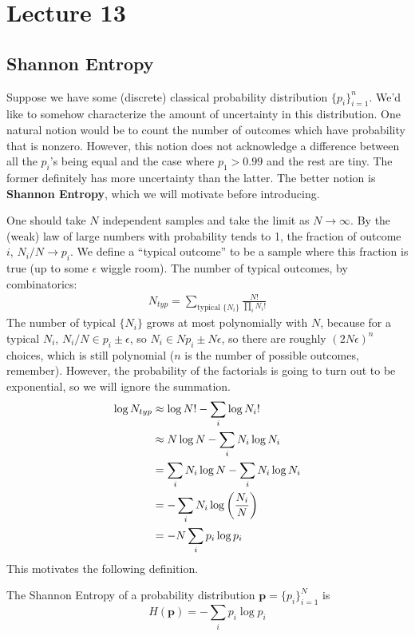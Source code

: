 \section{Lecture 13}

\subsection{Shannon Entropy}
Suppose we have some (discrete) classical probability distribution $\{p_i\}_{i = 1}^n$. We'd like to somehow
characterize the amount of uncertainty in this distribution. One natural notion would be to count the number of outcomes which
have probability that is nonzero. However, this notion does not acknowledge a difference between all the $p_i$'s being equal
and the case where $p_1 > 0.99$ and the rest are tiny. The former definitely has more uncertainty than the latter.
The better notion is \textbf{Shannon Entropy}, which we will motivate before introducing.

One should take $N$ independent samples and take the limit as $N \to \infty$. By the (weak) law of large numbers
with probability tends to 1, the fraction of outcome $i$, $N_i/N \to p_i$. We define a ``typical outcome'' to be a sample where
this fraction is true (up to some $\epsilon$ wiggle room). The number of typical outcomes, by combinatorics:
\begin{align*}
    N_{typ} = \sum_{\text{typical } \{N_i\}}\frac{N!}{\prod_{i} N_i!}
\end{align*}
The number of typical $\{N_i\}$ grows at most polynomially with $N$, because for a typical $N_i$,
$N_i/N \in p_i \pm \epsilon$, so $N_i \in Np_i \pm N \epsilon$, so there are roughly $(2N \epsilon)^n$ choices,
which is still polynomial ($n$ is the number of possible outcomes, remember). However, the probability of the factorials is
going to turn out to be exponential, so we will ignore the summation.
\begin{align*}
    \log N_{typ} &\approx \log N! - \sum_i \log N_i! \\
    &\approx N \log N - \sum_i N_i \log N_i \\
    &= \sum_i N_i \log N - \sum_i N_i \log N_i \\
    &= - \sum_i N_i \log \qty(\frac{N_i}{N}) \\
    &= - N \sum_i p_i \log p_i
\end{align*}
This motivates the following definition.

\begin{definition}
    The Shannon Entropy of a probability distribution $\mathbf{p} = \{p_i\}_{i = 1}^N$ is
    \[ H(\mathbf{p}) = -\sum_i p_i \log p_i \] 
\end{definition}

